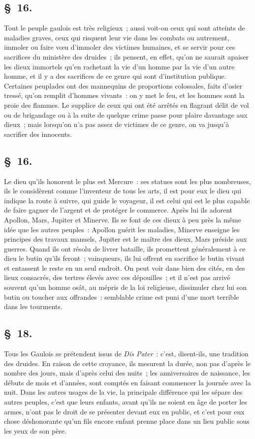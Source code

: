 \documentclass[french,twoside]{book} %
\begin{document}
\subsection[{§ 16.}]{ \textsc{§ 16.} }
\noindent Tout le peuple gaulois est très religieux ; aussi voit-on ceux qui sont atteints de maladies graves, ceux qui risquent leur vie dans les combats ou autrement, immoler ou faire vœu d’immoler des victimes humaines, et se servir pour ces sacrifices du ministère des druides ; ils pensent, en effet, qu’on ne saurait apaiser les dieux immortels qu’en rachetant la vie d’un homme par la vie d’un autre homme, et il y a des sacrifices de ce genre qui sont d’institution publique. Certaines peuplades ont des mannequins de proportions colossales, faits d’osier tressé, qu’on remplit d’hommes vivants : on y met le feu, et les hommes sont la proie des flammes. Le supplice de ceux qui ont été arrêtés en flagrant délit de vol ou de brigandage ou à la suite de quelque crime passe pour plaire davantage aux dieux ; mais lorsqu’on n’a pas assez de victimes de ce genre, on va jusqu’à sacrifier des innocents.
\subsection[{§ 16.}]{ \textsc{§ 16.} }
\noindent Le dieu qu’ils honorent le plus est Mercure : ses statues sont les plus nombreuses, ils le considèrent comme l’inventeur de tous les arts, il est pour eux le dieu qui indique la route à suivre, qui guide le voyageur, il est celui qui est le plus capable de faire gagner de l’argent et de protéger le commerce. Après lui ils adorent Apollon, Mars, Jupiter et Minerve. Ils se font de ces dieux à peu près la même idée que les autres peuples : Apollon guérit les maladies, Minerve enseigne les principes des travaux manuels, Jupiter est le maître des dieux, Mars préside aux guerres. Quand ils ont résolu de livrer bataille, ils promettent généralement à ce dieu le butin qu’ils feront ; vainqueurs, ils lui offrent en sacrifice le butin vivant et entassent le reste en un seul endroit. On peut voir dans bien des cités, en des lieux consacrés, des tertres élevés avec ces dépouilles ; et il n’est pas arrivé souvent qu’un homme osât, au mépris de la loi religieuse, dissimuler chez lui son butin ou toucher aux offrandes : semblable crime est puni d’une mort terrible dans les tourments.
\subsection[{§ 18.}]{ \textsc{§ 18.} }
\noindent Tous les Gaulois se prétendent issus de {\itshape Dis Pater} : c’est, disent-ils, une tradition des druides. En raison de cette croyance, ils mesurent la durée, non pas d’après le nombre des jours, mais d’après celui des nuits ; les anniversaires de naissance, les débuts de mois et d’années, sont comptés en faisant commencer la journée avec la nuit. Dans les autres usages de la vie, la principale différence qui les sépare des autres peuples, c’est que leurs enfants, avant qu’ils ne soient en âge de porter les armes, n’ont pas le droit de se présenter devant eux en public, et c’est pour eux chose déshonorante qu’un fils encore enfant prenne place dans un lieu public sous les yeux de son père.
\end{document}
